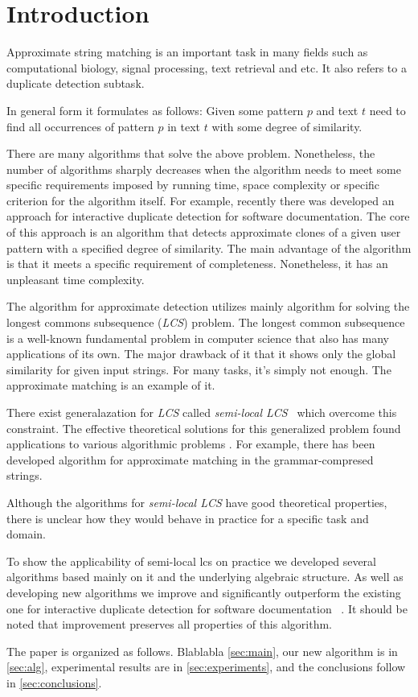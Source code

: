 \section{Introduction}
Approximate string matching is an important task in many fields such as computational biology, signal processing, text retrieval and etc.
It also refers to a duplicate detection subtask.

In general form it formulates as follows: Given some pattern $p$ and text $t$ need to find all occurrences of pattern $p$ in text $t$ with some degree of similarity.

There are many algorithms that solve the above problem.
Nonetheless, the number of algorithms sharply decreases  when the algorithm needs to meet some specific requirements imposed by running time, space complexity or specific criterion for the algorithm itself.
For example, recently there was developed an approach for interactive duplicate detection for software documentation\red{\cite{}}.
The core of this approach is an algorithm that detects approximate clones of a given user pattern with a specified degree of similarity. 
The main advantage of the algorithm is that it meets a specific requirement of completeness.
Nonetheless, it has an unpleasant time complexity.    


The algorithm for approximate detection utilizes mainly algorithm for solving the longest commons subsequence (\emph{LCS}) problem.
The longest common subsequence is a well-known fundamental problem in computer science that also has many applications of its own.
The major drawback of it that it shows only the global similarity for given input strings.
For many tasks, it's simply not enough.
The approximate matching is an example of it.

There exist generalazation for \emph{LCS} called \emph{semi-local LCS}~\cite{} which overcome this constraint. 
The effective theoretical solutions for this generalized problem found applications to various algorithmic problems .
For example, there has been developed algorithm for approximate matching in the grammar-compresed strings\cite{}.

Although the algorithms for \emph{semi-local LCS} have good theoretical properties, there is unclear how they would behave in practice for a specific task and domain.

To show the applicability of semi-local lcs on practice we developed several algorithms based mainly on it and the underlying algebraic structure.
As well as developing new algorithms we improve and significantly outperform the existing one for interactive duplicate detection for software documentation ~\cite{}.
It should be noted that improvement preserves all properties of this algorithm.



The paper is organized as follows.
Blablabla
\cref{sec:main}, our new algorithm is in \cref{sec:alg}, experimental
results are in \cref{sec:experiments}, and the conclusions follow in
\cref{sec:conclusions}.

